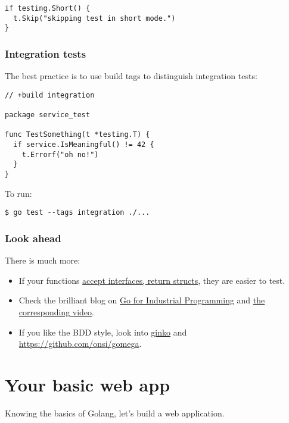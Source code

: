 \documentclass[11pt, letterpaper]{article}
\begin{document}
\begin{verbatim}
if testing.Short() {
  t.Skip("skipping test in short mode.")
}
\end{verbatim}

\subsubsection{Integration tests}

The best practice is to use build tags to distinguish integration tests:

\begin{verbatim}
// +build integration

package service_test

func TestSomething(t *testing.T) {
  if service.IsMeaningful() != 42 {
    t.Errorf("oh no!")
  }
}
\end{verbatim}

To run:

\begin{verbatim}
$ go test --tags integration ./...
\end{verbatim}

\subsubsection{Look ahead}
There is much more:

\begin{itemize}
\item If your functions \href{https://blog.chewxy.com/2018/03/18/golang-interfaces/}{accept interfaces, return structs}, they are easier to test.
\item Check the brilliant blog on \href{https://peter.bourgon.org/go-for-industrial-programming/}{Go for Industrial Programming} and \href{https://www.youtube.com/watch?v=PTE4VJIdHPg}{the corresponding video}.
\item If you like the BDD style, look into \href{https://github.com/onsi/ginkgo}{ginko} and \href{gomega}{https://github.com/onsi/gomega}.
\end{itemize}

\pagebreak
\section{Your basic web app}

Knowing the basics of Golang, let's build a web application.
\end{document}
